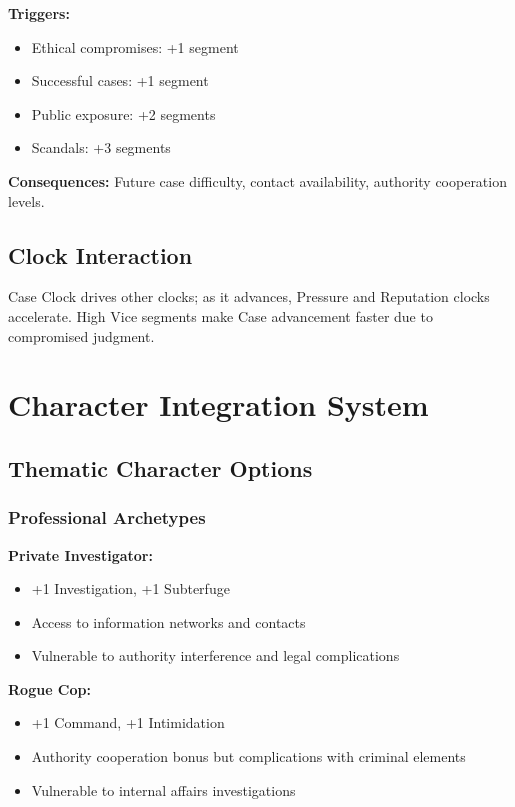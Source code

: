 \documentclass[11pt]{article}
\begin{document}
\textbf{Triggers:}
\begin{itemize}
\item Ethical compromises: +1 segment
\item Successful cases: +1 segment
\item Public exposure: +2 segments
\item Scandals: +3 segments
\end{itemize}

\textbf{Consequences:} Future case difficulty, contact availability, authority cooperation levels.

\subsection{Clock Interaction}

Case Clock drives other clocks; as it advances, Pressure and Reputation clocks accelerate. High Vice segments make Case advancement faster due to compromised judgment.

\section{Character Integration System}

\subsection{Thematic Character Options}

\subsubsection{Professional Archetypes}

\textbf{Private Investigator:}
\begin{itemize}
\item +1 Investigation, +1 Subterfuge
\item Access to information networks and contacts
\item Vulnerable to authority interference and legal complications
\end{itemize}

\textbf{Rogue Cop:}
\begin{itemize}
\item +1 Command, +1 Intimidation
\item Authority cooperation bonus but complications with criminal elements
\item Vulnerable to internal affairs investigations
\end{itemize}
\end{document}
